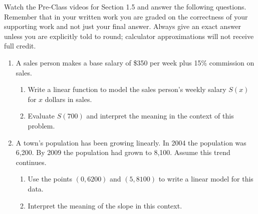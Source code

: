


\noindent Watch the Pre-Class videos for Section 1.5 and answer the following questions. Remember that in your written work you are graded on the correctness of your supporting work and not just your final answer. Always give an exact answer unless you are explicitly told to round; calculator approximations will not receive full credit. \\



\begin{enumerate}
\item A sales person makes a base salary of \$350 per week plus 15\% commission on sales.
\begin{enumerate}
\item Write a linear function to model the sales person's weekly salary $S(x)$ for $x$ dollars in sales.\vfill
\item Evaluate $S(700)$ and interpret the meaning in the context of this problem.
\end{enumerate}

\vfill
\item A town's population has been growing linearly. In 2004 the population was 6,200. By 2009 the population had grown to 8,100. Assume this trend continues.

\begin{enumerate}
\item Use the points $(0,6200)$ and $(5,8100)$ to write a linear model for this data.
\vfill
\item Interpret the meaning of the slope in this context.
\end{enumerate}

\vfill




\end{enumerate}



